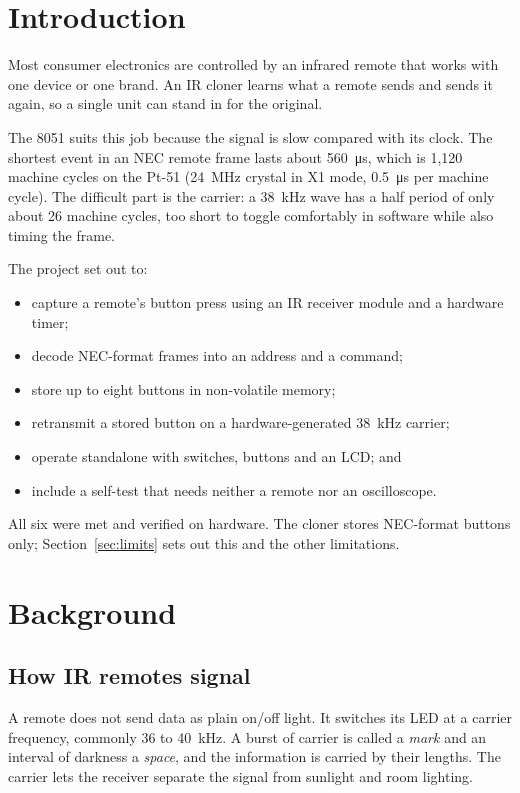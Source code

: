 \documentclass[11pt,a4paper]{article}
\begin{document}
{\small\setlength{\parskip}{0pt}\tableofcontents}
\newpage

\section{Introduction}

Most consumer electronics are controlled by an infrared remote that works with one device or one brand. An IR cloner learns what a remote sends and sends it again, so a single unit can stand in for the original.

The 8051 suits this job because the signal is slow compared with its clock. The shortest event in an NEC remote frame lasts about \qty{560}{\micro\second}, which is 1,120 machine cycles on the Pt-51 (\qty{24}{\mega\hertz} crystal in X1 mode, \qty{0.5}{\micro\second} per machine cycle). The difficult part is the carrier: a \qty{38}{\kilo\hertz} wave has a half period of only about 26 machine cycles, too short to toggle comfortably in software while also timing the frame.

The project set out to:
\begin{itemize}
\item capture a remote's button press using an IR receiver module and a hardware timer;
\item decode NEC-format frames into an address and a command;
\item store up to eight buttons in non-volatile memory;
\item retransmit a stored button on a hardware-generated \qty{38}{\kilo\hertz} carrier;
\item operate standalone with switches, buttons and an LCD; and
\item include a self-test that needs neither a remote nor an oscilloscope.
\end{itemize}

All six were met and verified on hardware. The cloner stores NEC-format buttons only; Section~\ref{sec:limits} sets out this and the other limitations.

\section{Background}

\subsection{How IR remotes signal}

A remote does not send data as plain on/off light. It switches its LED at a carrier frequency, commonly 36 to \qty{40}{\kilo\hertz}. A burst of carrier is called a \emph{mark} and an interval of darkness a \emph{space}, and the information is carried by their lengths. The carrier lets the receiver separate the signal from sunlight and room lighting.
\end{document}
